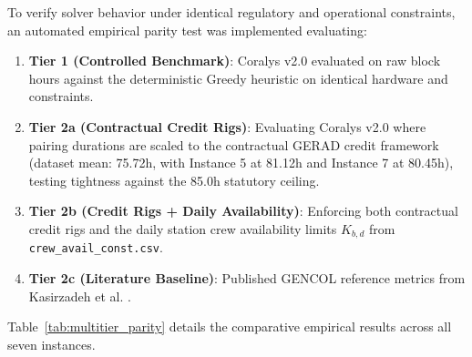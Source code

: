 \documentclass[journal]{IEEEtran}
\begin{document}
To verify solver behavior under identical regulatory and operational constraints, an automated empirical parity test was implemented evaluating:
\begin{enumerate}
    \item \textbf{Tier 1 (Controlled Benchmark)}: Coralys v2.0 evaluated on raw block hours against the deterministic Greedy heuristic on identical hardware and constraints.
    \item \textbf{Tier 2a (Contractual Credit Rigs)}: Evaluating Coralys v2.0 where pairing durations are scaled to the contractual GERAD credit framework (dataset mean: 75.72h, with Instance 5 at 81.12h and Instance 7 at 80.45h), testing tightness against the 85.0h statutory ceiling.
    \item \textbf{Tier 2b (Credit Rigs + Daily Availability)}: Enforcing both contractual credit rigs and the daily station crew availability limits $K_{b, d}$ from \texttt{crew\_avail\_const.csv}.
    \item \textbf{Tier 2c (Literature Baseline)}: Published GENCOL reference metrics from Kasirzadeh et al. \cite{kasirzadeh2017}.
\end{enumerate}

Table~\ref{tab:multitier_parity} details the comparative empirical results across all seven instances.
\end{document}
